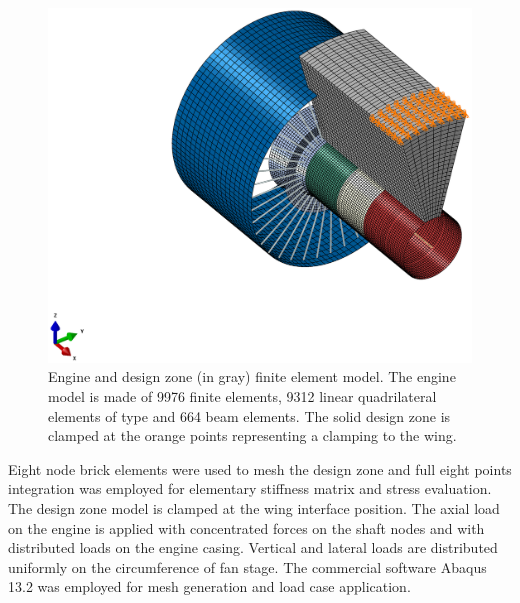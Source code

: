 \begin{figure}[hbt!]
\centering
\includegraphics[width=1\textwidth]{images/Ch1/FEM_intro.eps}
\caption{\label{f.1} Engine and design zone (in gray) finite element model. The engine model is made of 9976 finite elements, 9312 linear quadrilateral elements of type and 664 beam elements. The solid design zone is clamped at the orange points representing a clamping to the wing.}
\end{figure}
Eight node brick elements were used to mesh the design zone and full eight points integration was employed for elementary stiffness matrix and stress evaluation. The design zone model is clamped at the wing interface position. The axial load on the engine is applied with concentrated forces on the shaft nodes and with distributed loads on the engine casing. Vertical and lateral loads are distributed uniformly on the circumference of fan stage. %
The commercial software Abaqus 13.2 was employed for mesh generation and load case application.
